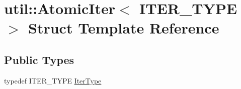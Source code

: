 \hypertarget{structutil_1_1AtomicIter}{\section{util\-:\-:Atomic\-Iter$<$ I\-T\-E\-R\-\_\-\-T\-Y\-P\-E $>$ Struct Template Reference}
\label{structutil_1_1AtomicIter}
}
\subsection*{Public Types}
\begin{DoxyCompactItemize}
\item 
typedef I\-T\-E\-R\-\_\-\-T\-Y\-P\-E \hyperlink{structutil_1_1AtomicIter_acc67d8bb75f4998782b2f8643ff5abc4}{Iter\-Type}
\end{DoxyCompactItemize}
